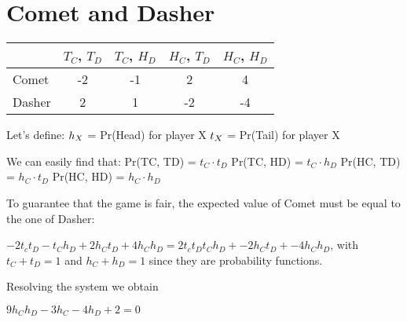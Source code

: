 \section{Comet and Dasher}

\begin{tabular}{l*{4}{c}}
			& $T_C$, $T_D$ & $T_C$, $H_D$ & $H_C$, $T_D$ & $H_C$, $H_D$ \\
	\hline
	Comet & -2 & -1 & 2 & 4 \\
	\hline
	Dasher & 2 & 1 & -2 & -4 \\
\end{tabular}

Let's define:
$\newline h_X$ = Pr(Head) for player X
$\newline t_X$ = Pr(Tail) for player X

We can easily find that:
Pr(TC, TD) = $t_C \cdot t_D$
Pr(TC, HD) = $t_C \cdot h_D$
Pr(HC, TD) = $h_C \cdot t_D$
Pr(HC, HD) = $h_C \cdot h_D$

To guarantee that the game is fair, the expected value of Comet must be equal to the one of Dasher:

$-2 t_c t_D -t_C h_D + 2h_C t_D + 4 h_C h_D = 2 t_c t_D t_C h_D + -2h_C t_D + -4 h_C h_D$,
with $t_C + t_D = 1$ and $h_C + h_D = 1$ since they are probability functions.

Resolving the system we obtain 

$9h_C h_D -3h_C - 4h_D +2 = 0$